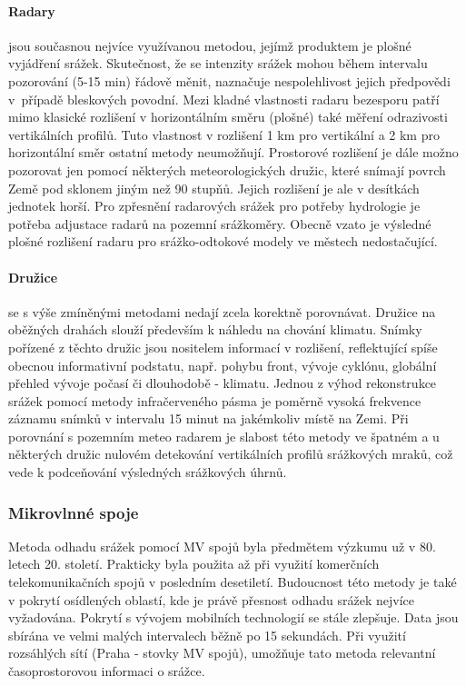 \documentclass[a4paper,12pt,oneside]{report}
\begin{document}
\paragraph*{Radary}
jsou současnou nejvíce využívanou metodou, jejímž produktem je plošné vyjádření srážek.
Skutečnost, že se intenzity srážek mohou během intervalu 
pozorování (5-15 min) řádově měnit, naznačuje nespolehlivost jejich předpovědi 
v~pří\-padě bleskových povodní. Mezi kladné vlastnosti radaru
bezesporu patří mimo klasické rozlišení v horizontálním směru (plošné)
také měření odrazivosti vertikálních profilů. Tuto vlastnost v
rozlišení 1 km pro vertikální a 2 km pro horizontální směr ostatní metody
neumožňují. Prostorové rozlišení je dále možno pozorovat jen pomocí
některých meteorologických družic, které snímají povrch Země pod sklonem
jiným než 90 stupňů. Jejich rozlišení je ale v desítkách jednotek
horší. Pro zpřesnění radarových srážek pro potřeby hydrologie je
potřeba adjustace radarů na pozemní srážkoměry. Obecně vzato je
výsledné plošné rozlišení radaru pro srážko-odtokové modely
 ve městech nedostačující.

\paragraph*{Družice} se s výše zmíněnými metodami nedají zcela
korektně porovnávat. Družice na oběžných drahách slouží především k
náhledu na chování klimatu. Snímky pořízené z těchto družic jsou nositelem
informací v rozlišení, reflektující spíše obecnou informativní
podstatu, např. pohybu front, vývoje cyklónu, globální přehled vývoje
počasí či dlouhodobě - klimatu.  Jednou z výhod rekonstrukce srážek
pomocí metody infračerveného pásma je poměrně vysoká frekvence záznamu
snímků v intervalu 15 minut na jakémkoliv místě na Zemi. Při porovnání
s pozemním meteo radarem je slabost této metody ve špatném a u
některých družic nulovém detekování vertikálních profilů srážkových
mraků, což vede k podceňování výsledných srážkových úhrnů.


\subsubsection{Mikrovlnné spoje}
Metoda odhadu srážek pomocí MV spojů byla předmětem výzkumu už v
80. letech 20. století. Prakticky byla použita až při využití
komerčních telekomunikačních spojů v posledním desetiletí. Budoucnost
této metody je také v pokrytí osídlených oblastí, kde je právě
přesnost odhadu srážek nejvíce vyžadována. Pokrytí s vývojem mobilních
technologií se stále zlepšuje. Data jsou sbírána ve velmi malých
intervalech běžně po 15 sekundách. Při využití rozsáhlých sítí (Praha - stovky
MV spojů), umožňuje tato metoda relevantní časoprostorovou informaci o
srážce.
 
\end{document}

